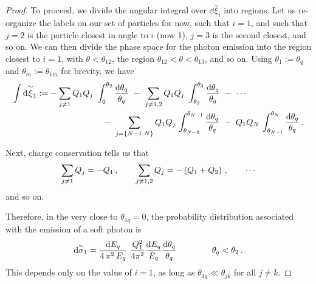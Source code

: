 \begin{proof}
   To proceed, we divide the angular integral over \(\dd\overset{\sim}{\xi}_i\) into regions.
    Let us re-organize the labels on our set of particles for now, such that \(i = 1\), and such that \(j=2\) is the particle closest in angle to \(i\) (now 1), \(j=3\) is the second closest, and so on.
    We can then divide the phase space for the photon emission into the region closest to \(i=1\), with \(\theta < \theta_{12}\), the region \(\theta_{12} < \theta < \theta_{13}\), and so on.
    Using \(\theta_1 := \theta_q\) and \(\theta_m := \theta_{1m}\) for brevity, we have
    \begin{align}
        \label{eq:qed-angular-phase-space-cones}
        \int
       \dd\overset{\sim}{\xi}_1
       :=&
       -
       \sum_{j \neq 1}
       Q_1 Q_j
       \,\,
       \int_0^{\theta_{2}} \frac{\dd\theta_{q}}{\theta_{q}}
       \,\,
       -
       \,\,
       \sum_{j \neq 1,2}
       Q_1 Q_j
       \,\,
       \int_{\theta_{2}}^{\theta_{3}} \frac{\dd\theta_{q}}{\theta_{q}}
       \,\,
       -
       \,\,
       \cdots
       \\
       &\qquad\qquad\qquad
       \notag
       \,\,
       -
       \,\,
       \sum_{j = \{N-1, N\}}
       Q_1 Q_j
       \,
       \int_{\theta_{N-2}}^{\theta_{N-1}} \frac{\dd\theta_{q}}{\theta_{q}}
       \,\,
       -
       \,\,
       Q_1 Q_N
       \,
       \int_{\theta_{N-1}}^{\theta_{N}} \frac{\dd\theta_{q}}{\theta_{q}}
       \,.
    \end{align}

    Next, charge conservation tells us that
    \begin{align}
        \label{eq:qed-charge-conservation}
        \sum_{j \neq 1} Q_j
        =
        -Q_1
        \,,
        \qquad
        \sum_{j \neq 1,2} Q_j
        =
        -\le(Q_1+Q_2\ri)
        \,,
        \qquad
        \cdots
    \end{align}
    and so on.

    Therefore, in the  very close to \(\theta_{1q} = 0\), the probability distribution associated with the emission of a soft photon is
    \begin{align}
        \dd\overset{\sim}{\sigma}_1
        =
        \frac{\dd E_q}{4\,\pi^2\, E_q}
        \,\,
        \frac{Q_1^2}{4\pi^2}
        \frac{\dd E_q}{E_q}
        \frac{\dd\theta_q}{\theta_{q}}
        \,
        \qquad\qquad
        \theta_q < \theta_2
        \,.
    \end{align}
    This depends only on the value of \(i=1\), as long as \(\theta_{1q} \ll \theta_{jk}\) for all \(j \neq k\).


\end{proof}
